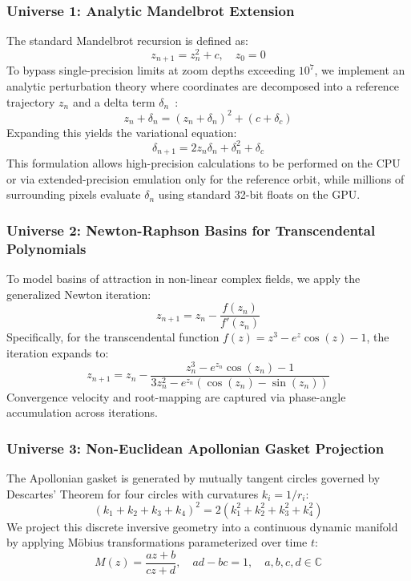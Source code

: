 \documentclass[10pt,journal,compsoc]{IEEEtran}
\begin{document}
\subsubsection{Universe 1: Analytic Mandelbrot Extension}
The standard Mandelbrot recursion is defined as:
\begin{equation}
z_{n+1} = z_n^2 + c, \quad z_0 = 0
\end{equation}
To bypass single-precision limits at zoom depths exceeding $10^7$, we implement an analytic perturbation theory where coordinates are decomposed into a reference trajectory $z_n$ and a delta term $\delta_n$~\cite{peitgen1986beauty, quilezfractal}:
\begin{equation}
z_n + \delta_n = (z_n + \delta_n)^2 + (c + \delta_c)
\end{equation}
Expanding this yields the variational equation:
\begin{equation}
\delta_{n+1} = 2z_n \delta_n + \delta_n^2 + \delta_c
\end{equation}
This formulation allows high-precision calculations to be performed on the CPU or via extended-precision emulation only for the reference orbit, while millions of surrounding pixels evaluate $\delta_n$ using standard 32-bit floats on the GPU.

\subsubsection{Universe 2: Newton-Raphson Basins for Transcendental Polynomials}
To model basins of attraction in non-linear complex fields, we apply the generalized Newton iteration:
\begin{equation}
z_{n+1} = z_n - \frac{f(z_n)}{f'(z_n)}
\end{equation}
Specifically, for the transcendental function $f(z) = z^3 - e^z \cos(z) - 1$, the iteration expands to:
\begin{equation}
z_{n+1} = z_n - \frac{z_n^3 - e^{z_n}\cos(z_n) - 1}{3z_n^2 - e^{z_n}(\cos(z_n) - \sin(z_n))}
\end{equation}
Convergence velocity and root-mapping are captured via phase-angle accumulation across iterations.

\subsubsection{Universe 3: Non-Euclidean Apollonian Gasket Projection}
The Apollonian gasket is generated by mutually tangent circles governed by Descartes' Theorem for four circles with curvatures $k_i = 1/r_i$:
\begin{equation}
(k_1 + k_2 + k_3 + k_4)^2 = 2(k_1^2 + k_2^2 + k_3^2 + k_4^2)
\end{equation}
We project this discrete inversive geometry into a continuous dynamic manifold by applying Möbius transformations parameterized over time $t$:
\begin{equation}
M(z) = \frac{az + b}{cz + d}, \quad ad - bc = 1, \quad a,b,c,d \in \mathbb{C}
\end{equation}
\end{document}
